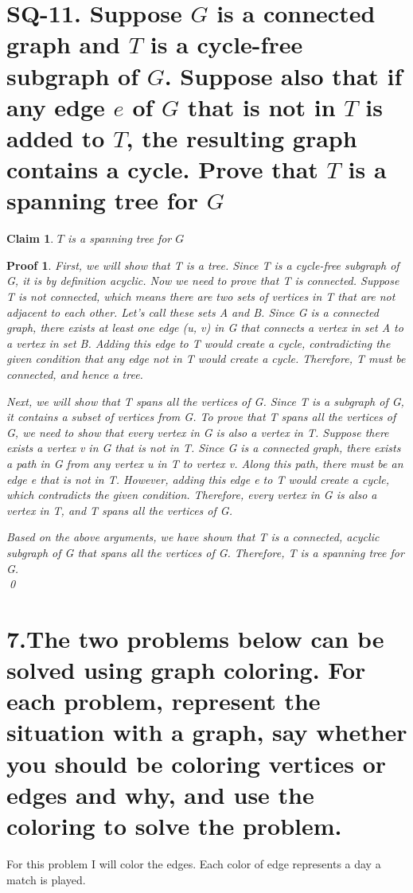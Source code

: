 \documentclass{article}
\newtheorem*{claim}{Claim}
\newtheorem*{poof}{Proof}
\begin{document}
\section*{SQ-11. Suppose $G$ is a connected graph and $T$ is a cycle-free subgraph of $G$. Suppose also that if any edge $e$ of $G$ that is not in $T$ is added to $T$, the resulting graph contains a cycle. Prove that $T$ is a spanning tree for $G$}
\begin{claim}
    $T$ is a spanning tree for $G$
\end{claim}
\begin{poof}
    First, we will show that T is a tree. Since T is a cycle-free subgraph of G, it is by definition acyclic. Now we need to prove that T is connected. Suppose T is not connected, which means there are two sets of vertices in T that are not adjacent to each other. Let's call these sets A and B. Since G is a connected graph, there exists at least one edge (u, v) in G that connects a vertex in set A to a vertex in set B. Adding this edge to T would create a cycle, contradicting the given condition that any edge not in T would create a cycle. Therefore, T must be connected, and hence a tree.

    Next, we will show that T spans all the vertices of G. Since T is a subgraph of G, it contains a subset of vertices from G. To prove that T spans all the vertices of G, we need to show that every vertex in G is also a vertex in T. Suppose there exists a vertex v in G that is not in T. Since G is a connected graph, there exists a path in G from any vertex u in T to vertex v. Along this path, there must be an edge e that is not in T. However, adding this edge e to T would create a cycle, which contradicts the given condition. Therefore, every vertex in G is also a vertex in T, and T spans all the vertices of G.
    
    Based on the above arguments, we have shown that T is a connected, acyclic subgraph of G that spans all the vertices of G. Therefore, T is a spanning tree for G.\\
\qed\end{poof}
\newpage
\section*{7.The two problems below can be solved using graph coloring. For each problem, represent the situation with a graph, say whether you should be coloring vertices or edges and why, and use the coloring to solve the problem.}
For this problem I will color the edges. Each color of edge represents a day a match is played.
\end{document}
